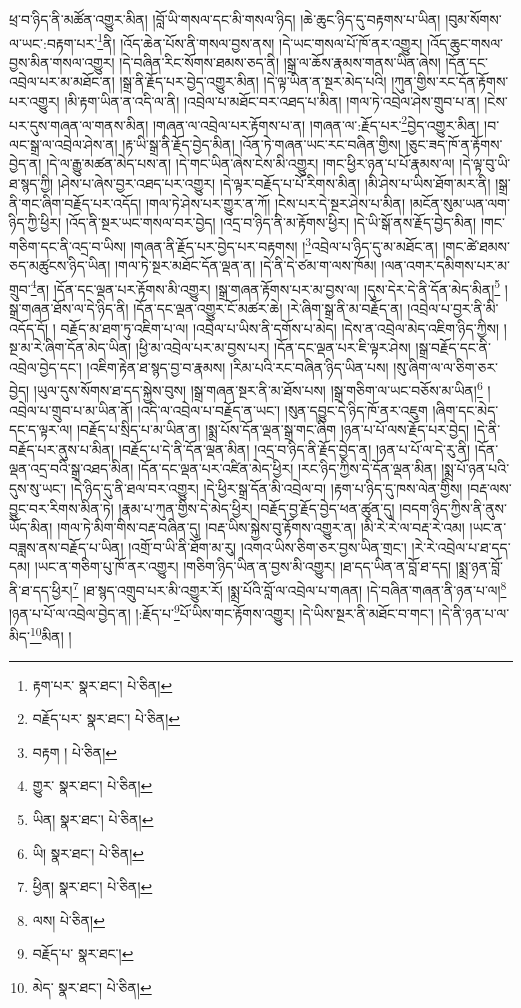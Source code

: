 ཕྲ་བ་ཉིད་ནི་མཚོན་འགྱུར་མིན། །བློ་ཡི་གསལ་དང་མི་གསལ་ཉིད། །ཆེ་ཆུང་ཉིད་དུ་བརྟགས་པ་ཡིན། །བུམ་སོགས་ལ་ཡང་:བརྟག་པར་\footnote{རྟག་པར་  སྣར་ཐང་།  པེ་ཅིན། }ནི། །འོད་ཆེན་པོས་ནི་གསལ་བྱས་ནས། །དེ་ཡང་གསལ་པོ་ཁོ་ནར་འགྱུར། །འོད་ཆུང་གསལ་བྱས་མིན་གསལ་འགྱུར། །དེ་བཞིན་རིང་སོགས་ཐམས་ཅད་ནི། །སྒྲ་ལ་ཆོས་རྣམས་གནས་ཡིན་ཞེས། །དོན་དང་འབྲེལ་པར་མ་མཐོང་ན། །སྒྲ་ནི་རྗོད་པར་བྱེད་འགྱུར་མིན། །དེ་ལྟ་ཡིན་ན་སྔར་མེད་པའི། །ཀུན་གྱིས་རང་དོན་རྟོགས་པར་འགྱུར། །མི་རྟག་ཡིན་ན་འདི་ལ་ནི། །འབྲེལ་པ་མཐོང་བར་འཐད་པ་མིན། །གལ་ཏེ་འབྲེལ་ཤེས་གྲུབ་པ་ན། །ངེས་པར་དུས་གཞན་ལ་གནས་མིན། །གཞན་ལ་འབྲེལ་པར་རྟོགས་པ་ན། །གཞན་ལ་:རྗོད་པར་\footnote{བརྗོད་པར་  སྣར་ཐང་།  པེ་ཅིན། }བྱེད་འགྱུར་མིན། །བ་ལང་སྒྲ་ལ་འབྲེལ་ཤེས་ན། །རྟ་ཡི་སྒྲ་ནི་རྗོད་བྱེད་མིན། །འོན་ཏེ་གཞན་ཡང་རང་བཞིན་གྱིས། །ཅུང་ཟད་ཁོ་ན་རྟོགས་བྱེད་ན། །དེ་ལ་རྒྱུ་མཚན་མེད་པས་ན། །དེ་གང་ཡིན་ཞེས་ངེས་མི་འགྱུར། །གང་ཕྱིར་ཉན་པ་པོ་རྣམས་ལ། །དེ་ལྟ་བུ་ཡི་ཐ་སྙད་ཀྱི། །ཤེས་པ་ཞེས་བྱར་འཐད་པར་འགྱུར། །དེ་ལྟར་བརྗོད་པ་པོ་རིགས་མིན། །མི་ཤེས་པ་ཡིས་ཐོག་མར་ནི། །སྒྲ་ནི་གང་ཞིག་བརྗོད་པར་འདོད། །གལ་ཏེ་ཤེས་པར་གྱུར་ན་ཀོ། །ངེས་པར་དེ་སྔར་ཤེས་པ་མིན། །མངོན་སུམ་ཡན་ལག་ཉིད་ཀྱི་ཕྱིར། །འོད་ནི་སྔར་ཡང་གསལ་བར་བྱེད། །འདྲ་བ་ཉིད་ནི་མ་རྟོགས་ཕྱིར། །དེ་ཡི་སྒོ་ནས་རྗོད་བྱེད་མིན། །གང་གཅིག་དང་ནི་འདྲ་བ་ཡིས། །གཞན་ནི་རྗོད་པར་བྱེད་པར་བརྟགས། །\footnote{བརྟག །  པེ་ཅིན། }འབྲེལ་པ་ཉིད་དུ་མ་མཐོང་ན། །གང་ཚེ་ཐམས་ཅད་མཚུངས་ཉིད་ཡིན། །གལ་ཏེ་སྔར་མཐོང་དོན་ལྡན་ན། །དེ་ནི་དེ་ཙམ་ག་ལས་ཁོམ། །ལན་འགར་དམིགས་པར་མ་གྲུབ་\footnote{གྱུར་  སྣར་ཐང་།  པེ་ཅིན། }ན། །དོན་དང་ལྡན་པར་རྟོགས་མི་འགྱུར། །སྒྲ་གཞན་རྟོགས་པར་མ་བྱས་ལ། །དུས་དེར་དེ་ནི་དོན་མེད་མིན།\footnote{ཡིན།  སྣར་ཐང་།  པེ་ཅིན། } །སྒྲ་གཞན་ཐོས་ལ་དེ་ཉིད་ནི། །དོན་དང་ལྡན་འགྱུར་ངོ་མཚར་ཆེ། །རེ་ཞིག་སྒྲ་ནི་མ་བརྗོད་ན། །འབྲེལ་པ་བྱར་ནི་མི་འདོད་དོ། །
བརྗོད་མ་ཐག་ཏུ་འཇིག་པ་ལ། །འབྲེལ་པ་ཡིས་ནི་དགོས་པ་མེད། །དེས་ན་འབྲེལ་མེད་འཇིག་ཉིད་ཀྱིས། །སྔ་མ་རེ་ཞིག་དོན་མེད་ཡིན། །ཕྱི་མ་འབྲེལ་པར་མ་བྱས་པར། །དོན་དང་ལྡན་པར་ཇི་ལྟར་ཤེས། །སྒྲ་བརྗོད་དང་ནི་འབྲེལ་བྱེད་དང་། །འཇིག་རྟེན་ཐ་སྙད་བྱ་བ་རྣམས། །རིམ་པའི་རང་བཞིན་ཉིད་ཡིན་པས། །སུ་ཞིག་ལ་ལ་ཅིག་ཅར་བྱེད། །ཡུལ་དུས་སོགས་ཐ་དད་སྐྱེས་བུས། །སྒྲ་གཞན་སྔར་ནི་མ་ཐོས་པས། །སྒྲ་གཅིག་ལ་ཡང་བཅོས་མ་ཡིན།\footnote{ཡི།  སྣར་ཐང་།  པེ་ཅིན། } །འབྲེལ་པ་གྲུབ་པ་མ་ཡིན་ནོ། །འདི་ལ་འབྲེལ་པ་བརྗོད་ན་ཡང་། །སུན་དབྱུང་དེ་ཉིད་ཁོ་ནར་འཇུག །ཞིག་དང་མེད་དང་ད་ལྟར་ལ། །བརྗོད་པ་སྲིད་པ་མ་ཡིན་ན། །སྨྲ་པོས་དོན་ལྡན་སྒྲ་གང་ཞིག །ཉན་པ་པོ་ལས་རྗོད་པར་བྱེད། །དེ་ནི་བརྗོད་པར་ནུས་པ་མིན། །བརྗོད་པ་དེ་ནི་དོན་ལྡན་མིན། །འདྲ་བ་ཉིད་ནི་རྗོད་བྱེད་ན། །ཉན་པ་པོ་ལ་དེ་རུ་ནི། །དོན་ལྡན་འདྲ་བའི་སྒྲ་འཐད་མིན། །དོན་དང་ལྡན་པར་འཛིན་མེད་ཕྱིར། །རང་ཉིད་ཀྱིས་དེ་དོན་ལྡན་མིན། །སྨྲ་པོ་ཉན་པའི་དུས་སུ་ཡང་། །དེ་ཉིད་དུ་ནི་ཐལ་བར་འགྱུར། །དེ་ཕྱིར་སྒྲ་དོན་མི་འབྲེལ་བ། །རྟག་པ་ཉིད་དུ་ཁས་ལེན་གྱིས། །བརྡ་ལས་བྱུང་བར་རིགས་མིན་ཏེ། །རྣམ་པ་ཀུན་གྱིས་དེ་མེད་ཕྱིར། །བརྗོད་བྱ་རྗོད་བྱེད་ཕན་ཚུན་དུ། །བདག་ཉིད་ཀྱིས་ནི་ནུས་ཡོད་མིན། །གལ་ཏེ་མིག་གིས་བརྡ་བཞིན་དུ། །བརྡ་ཡིས་སྐྱེས་བུ་རྟོགས་འགྱུར་ན། །མི་རེ་རེ་ལ་བརྡ་རེ་འམ། །ཡང་ན་བཟླས་ནས་བརྗོད་པ་ཡིན། །འགྲོ་བ་ཡི་ནི་ཐོག་མ་རུ། །འགའ་ཡིས་ཅིག་ཅར་བྱས་ཡིན་གྲང་། །རེ་རེ་འབྲེལ་པ་ཐ་དད་དམ། །ཡང་ན་གཅིག་པུ་ཁོ་ནར་འགྱུར། །གཅིག་ཉིད་ཡིན་ན་བྱས་མི་འགྱུར། །ཐ་དད་ཡིན་ན་བློ་ཐ་དད། །སྨྲ་ཉན་བློ་ནི་ཐ་དད་ཕྱིར།\footnote{ཕྱིན།  སྣར་ཐང་།  པེ་ཅིན། } །ཐ་སྙད་འགྲུབ་པར་མི་འགྱུར་རོ། །སྨྲ་པོའི་བློ་ལ་འབྲེལ་པ་གཞན། །དེ་བཞིན་གཞན་ནི་ཉན་པ་ལ།\footnote{ལས།  པེ་ཅིན། } །ཉན་པ་པོ་ལ་འབྲེལ་བྱེད་ན། །:རྗོད་པ་\footnote{བརྗོད་པ་  སྣར་ཐང་། }པོ་ཡིས་གང་རྟོགས་འགྱུར། །དེ་ཡིས་སྔར་ནི་མཐོང་བ་གང་། །དེ་ནི་ཉན་པ་ལ་མིད་\footnote{མེད་  སྣར་ཐང་།  པེ་ཅིན། }མིན། །
